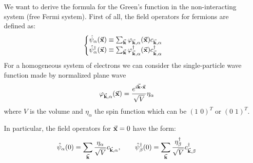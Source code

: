 \documentclass[11pt, a4paper, twoside, openright]{article}
\begin{document}
We want to derive the formula for the Green's function in the non-interacting system (free Fermi system). First of all, the field operators for fermions are defined as:
\begin{equation*}
  \begin{cases}
   \hat{\psi }_ \alpha  (\va{x}) \equiv  \sum_{\va{k}}^{} \varphi _{\va{k}, \alpha } (\va{x}) c_{\va{k}, \alpha }  \\
\hat{\psi }_ \alpha ^\dag   (\va{x}) \equiv  \sum_{\va{k}}^{} \varphi _{\va{k}, \alpha } ^\dag  (\va{x}) c_{\va{k}, \alpha } ^\dag
  \end{cases}
\end{equation*}
For a homogeneous system of electrons we can consider the single-particle wave function made by normalized plane wave
\begin{equation*}
  \varphi _{\va{k}, \alpha } (\va{x}) = \frac{e^{i \va{k} \vdot \va{x}} }{\sqrt{V} } \eta _{\alpha }
\end{equation*}
where \( V \) is the volume and \( \eta_ \alpha   \) the spin function which can be \( (1 \,\, 0 )^T\) or \( (0\,\, 1 )^T\).

In particular, the field operators for \( \va{x}=0 \) have the form:
\begin{equation*}
  \hat{\psi }_ \alpha (0) = \sum_{\va{k}}^{} \frac{\eta _ \alpha }{\sqrt{V} } c_{\va{k}, \alpha }, \qquad
  \hat{\psi }_ \beta ^\dag (0) = \sum_{\va{k}}^{} \frac{\eta _ \beta ^\dag  }{\sqrt{V} } c_{\va{k}, \beta }^\dag
\end{equation*}
\end{document}
